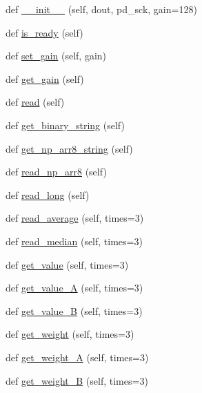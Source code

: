 \begin{DoxyCompactItemize}
\item 
def \hyperlink{classhx711_1_1HX711_ac3201a4ebefcbd6c940aeef1fb9091db}{\+\_\+\+\_\+init\+\_\+\+\_\+} (self, dout, pd\+\_\+sck, gain=128)
\item 
def \hyperlink{classhx711_1_1HX711_aa21bf76bdcbae0ee2d524c743385b183}{is\+\_\+ready} (self)
\item 
def \hyperlink{classhx711_1_1HX711_a5bd9ee578df2199446f2a1e01d37e7da}{set\+\_\+gain} (self, gain)
\item 
def \hyperlink{classhx711_1_1HX711_a43f366278bd30938be1996fbcfa44ec0}{get\+\_\+gain} (self)
\item 
def \hyperlink{classhx711_1_1HX711_a058945ca18a72069678eecbecbda8163}{read} (self)
\item 
def \hyperlink{classhx711_1_1HX711_acfc0c54486607da6813277dec303ea79}{get\+\_\+binary\+\_\+string} (self)
\item 
def \hyperlink{classhx711_1_1HX711_a9a014ef42240f63d6ce0829fbffed2c5}{get\+\_\+np\+\_\+arr8\+\_\+string} (self)
\item 
def \hyperlink{classhx711_1_1HX711_a915afbb08ddf74729d5bedd7ab1d934f}{read\+\_\+np\+\_\+arr8} (self)
\item 
def \hyperlink{classhx711_1_1HX711_a80e3ee545f81b32a3c3c9b446060b66e}{read\+\_\+long} (self)
\item 
def \hyperlink{classhx711_1_1HX711_a7b92aa87d496c118fcc3de2706b42f00}{read\+\_\+average} (self, times=3)
\item 
def \hyperlink{classhx711_1_1HX711_a8e769dcf2daebf051ca18b8dad4db6bd}{read\+\_\+median} (self, times=3)
\item 
def \hyperlink{classhx711_1_1HX711_a7cfa96e430088b6a40f3f3f342944faa}{get\+\_\+value} (self, times=3)
\item 
def \hyperlink{classhx711_1_1HX711_adc2094ba2da5b7667c6bc371d8587d2a}{get\+\_\+value\+\_\+A} (self, times=3)
\item 
def \hyperlink{classhx711_1_1HX711_a20ea4f05b17af2b5c3a1cf0a71781f07}{get\+\_\+value\+\_\+B} (self, times=3)
\item 
def \hyperlink{classhx711_1_1HX711_aab774e2f3fab77e31be1847716a4de7e}{get\+\_\+weight} (self, times=3)
\item 
def \hyperlink{classhx711_1_1HX711_a78538e468491629a2af993c1278b034c}{get\+\_\+weight\+\_\+A} (self, times=3)
\item 
def \hyperlink{classhx711_1_1HX711_afe8829ad4222d753116df385ffc35807}{get\+\_\+weight\+\_\+B} (self, times=3)
\item 

\end{DoxyCompactItemize}
